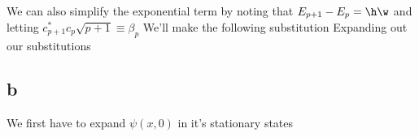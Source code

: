 We can also simplify the exponential term by noting that $E_{p+1}-E_p = \h \w$ and letting $c_{p+1}^\ast c_p \sqrt{p+1} \equiv \beta_p$
We'll make the following substitution
Expanding out our substitutions
\subsection*{b}
We first have to expand $\psi(x,0)$ in it's stationary states